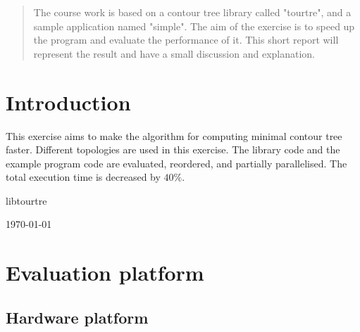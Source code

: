 \documentclass[conference]{IEEEtran}
\begin{document}




\maketitle

\begin{abstract}
The course work is based on a contour tree library called "tourtre",
and a sample application named "simple". The aim of the exercise is to speed up the program and evaluate the performance of it. This short report will represent the result and have a small discussion and explanation. 
\end{abstract}





%
\IEEEpeerreviewmaketitle



\section{Introduction}

This exercise aims to make the algorithm for computing minimal contour tree faster. Different topologies are used in this exercise. The library code and the example program code are evaluated, reordered, and partially parallelised. The total execution time is decreased by $40\%$.

libtourtre \cite{libtourtre}

\hfill \today

\section{Evaluation platform}

\subsection{Hardware platform}
\end{document}
